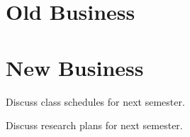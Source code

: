 \documentclass[11pt,chair]{meetingmins}
\begin{document}
\section{Old Business}
\begin{items}
\item
\priormins
\end{items}

\section{New Business}
\begin{items}
\item
Discuss class schedules for next semester.

\item
Discuss research plans for next semester.
\end{items}

\vspace{1em}
\end{document}
